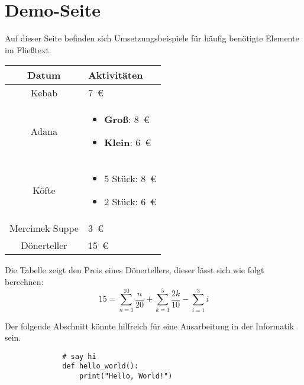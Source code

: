\section{Demo-Seite}
Auf dieser Seite befinden sich Umsetzungsbeispiele für häufig benötigte Elemente im Fließtext.\\

\begin{center}
    \begin{table}[H]
    \centering
    \begin{tabular}{|c|p{6cm}|}%
        \hline
        \textbf{Datum} & \textbf{Aktivitäten} \\
        \hline
        Kebab & 7 € \\
        \hline
        Adana & \begin{itemize}
            \item \textbf{Groß}: 8 €
            \item \textbf{Klein}: 6 €
        \end{itemize} \\
        \hline
        Köfte & \begin{itemize}
            \item 5 Stück: 8 €
            \item 2 Stück: 6 €
        \end{itemize}\\
        \hline
        Mercimek Suppe & 3 € \\
        \hline
        Dönerteller & 15 € \\
        \hline
    \end{tabular}
    \label{tab:preistabelle}%
    \end{table}
\end{center}

Die Tabelle zeigt den Preis eines Dönertellers, dieser lässt sich wie folgt berechnen:
\begin{equation}
    15 = \sum_{n=1}^{10} \frac{n}{20} + \sum_{k=1}^{5} \frac{2k}{10} - \sum_{i=1}^{3} i
\end{equation}

\newpage
Der folgende Abschnitt könnte hilfreich für eine Ausarbeitung in der Informatik sein.
\begin{figure}[H]
    \begin{lstlisting}
        # say hi
        def hello_world():
            print("Hello, World!")
    \end{lstlisting}
    \label{fig:meincode}%
\end{figure}


